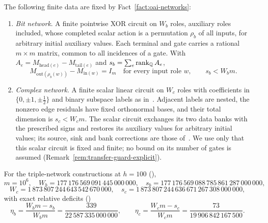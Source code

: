 \begin{definition}\label{def:fixed-network-premises}
The following finite data are fixed by Fact~\ref{fact:oai-networks}:
\begin{enumerate}[label=(\alph*),leftmargin=*]
\item \emph{Bit network.} A finite pointwise XOR circuit on $W_b$ roles, auxiliary roles included, whose completed
  scalar action is a permutation $\rho_b$ of all inputs, for arbitrary initial auxiliary values. Each terminal and gate
  carries a rational $m\times m$ matrix, common to all incidences of a gate. With
  $A_e=M_{\mathrm{head}(e)}-M_{\mathrm{tail}(e)}$ and $s_b=\sum_e\operatorname{rank}_{\mathbb{Q}}A_e$,
  \[
    M_{\mathrm{out}(\rho_b(w))}-M_{\mathrm{in}(w)}=I_m\quad\text{for every input role }w,\qquad s_b<W_bm .
  \]
\item \emph{Complex network.} A finite scalar linear circuit on $W_c$ roles with coefficients in
  $\{0,\pm1,\pm\frac12\}$ and binary subspace labels as in~\cite[Prop.~8, \S3.5]{OAI26}. Adjacent labels are nested,
  the nonzero edge residuals have fixed orthonormal bases, and their total dimension is $s_c<W_cm$. The scalar circuit
  exchanges its two data banks with the prescribed signs and restores its auxiliary values for arbitrary initial
  values; its source, sink and bank corrections are those of~\cite[proof of Prop.~8, \S3.5, pp.~19--20]{OAI26}. We use
  only that this scalar circuit is fixed and finite; no bound on its number of gates is assumed
  (Remark~\ref{rem:transfer-guard-explicit}).
\end{enumerate}
For the triple-network constructions at $h=100$ (\cite[\S3.1, (3)--(4); Props.~7--8, \S\S3.4--3.5; \S5.4, p.~35]{OAI26}),
\[
  m=10^6,\quad W_b=177\,176\,569\,091\,445\,000\,000,\quad s_b=177\,176\,569\,088\,785\,861\,287\,000\,000,
\]
\[
  W_c=1\,873\,807\,244\,643\,542\,670\,000,\quad s_c=1\,873\,807\,244\,636\,671\,267\,308\,000\,000,
\]
with exact relative deficits (\cite[\S3.6]{OAI26})
\[
  \eta_b=\frac{W_bm-s_b}{W_bm}=\frac{339}{22\,587\,335\,000\,000},\qquad
  \eta_c=\frac{W_cm-s_c}{W_cm}=\frac{73}{19\,906\,842\,167\,500}.
\]
\end{definition}


